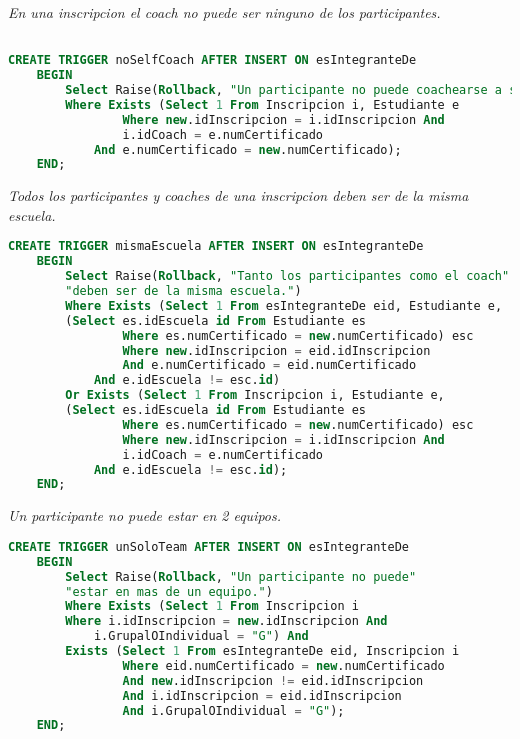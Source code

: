 \emph{En una inscripcion el coach no puede ser ninguno de los participantes.}

\begin{lstlisting}[language=SQL]

CREATE TRIGGER noSelfCoach AFTER INSERT ON esIntegranteDe
    BEGIN
        Select Raise(Rollback, "Un participante no puede coachearse a si mismo.")
        Where Exists (Select 1 From Inscripcion i, Estudiante e
                Where new.idInscripcion = i.idInscripcion And 
                i.idCoach = e.numCertificado
            And e.numCertificado = new.numCertificado);
    END;
\end{lstlisting}
  
\emph{Todos los participantes y coaches de una inscripcion deben ser de la misma escuela.}

\begin{lstlisting}[language=SQL]
CREATE TRIGGER mismaEscuela AFTER INSERT ON esIntegranteDe
    BEGIN
        Select Raise(Rollback, "Tanto los participantes como el coach" 
        "deben ser de la misma escuela.")
        Where Exists (Select 1 From esIntegranteDe eid, Estudiante e, 
        (Select es.idEscuela id From Estudiante es
                Where es.numCertificado = new.numCertificado) esc
                Where new.idInscripcion = eid.idInscripcion 
                And e.numCertificado = eid.numCertificado
            And e.idEscuela != esc.id)
        Or Exists (Select 1 From Inscripcion i, Estudiante e, 
        (Select es.idEscuela id From Estudiante es
                Where es.numCertificado = new.numCertificado) esc
                Where new.idInscripcion = i.idInscripcion And 
                i.idCoach = e.numCertificado
            And e.idEscuela != esc.id);
    END;
\end{lstlisting}

\emph{Un participante no puede estar en 2 equipos.}

\begin{lstlisting}[language=SQL]
CREATE TRIGGER unSoloTeam AFTER INSERT ON esIntegranteDe
    BEGIN
        Select Raise(Rollback, "Un participante no puede"
        "estar en mas de un equipo.")
        Where Exists (Select 1 From Inscripcion i 
        Where i.idInscripcion = new.idInscripcion And 
            i.GrupalOIndividual = "G") And 
        Exists (Select 1 From esIntegranteDe eid, Inscripcion i 
                Where eid.numCertificado = new.numCertificado 
                And new.idInscripcion != eid.idInscripcion
                And i.idInscripcion = eid.idInscripcion 
                And i.GrupalOIndividual = "G");
    END;
\end{lstlisting}
  
